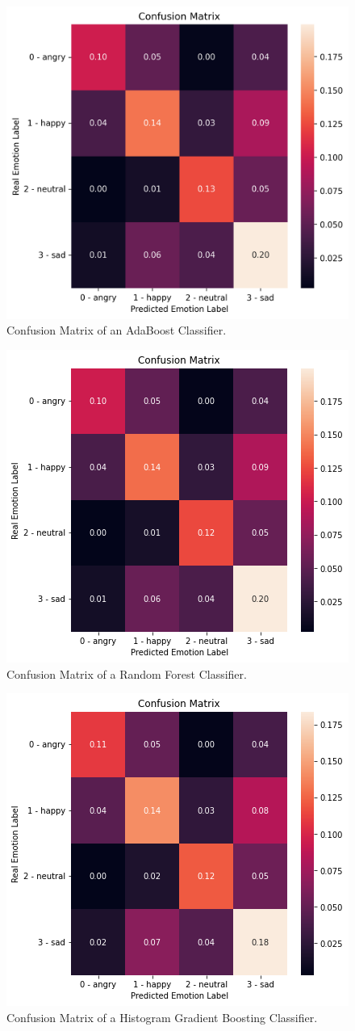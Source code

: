 \begin{figure}[H]
	\centering
	\includegraphics[width=.55\linewidth]{figs/appendix/feature_selection/AdaBoostCM.png}
	\caption{Confusion Matrix of an AdaBoost Classifier.}
\end{figure}

\begin{figure}[H]
	\centering
	\includegraphics[width=.55\linewidth]{figs/appendix/feature_selection/RandomForestCM.png}
	\caption{Confusion Matrix of a Random Forest Classifier.}
\end{figure}

\begin{figure}[H]
	\centering
	\includegraphics[width=.55\linewidth]{figs/appendix/feature_selection/HistCM.png}
	\caption{Confusion Matrix of a Histogram Gradient Boosting Classifier.}
\end{figure}

